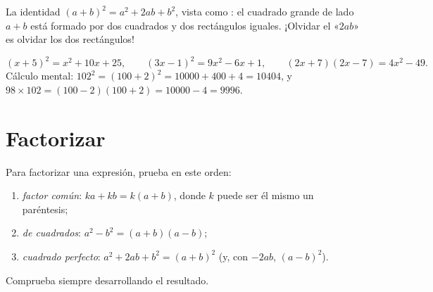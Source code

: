 \begin{omfigure}

{\small La identidad $(a+b)^2 = a^2 + 2ab + b^2$, vista como : el
cuadrado grande de lado $a+b$ está formado por dos cuadrados y dos rectángulos iguales.
¡Olvidar el «$2ab$» es olvidar los dos rectángulos!}
\end{omfigure}

\begin{example}\label{ex:g9:algebra:identities}
\[
(x + 5)^2 = x^2 + 10x + 25, \qquad
(3x - 1)^2 = 9x^2 - 6x + 1, \qquad
(2x + 7)(2x - 7) = 4x^2 - 49 .
\]
Cálculo mental: $102^2 = (100 + 2)^2 = 10000 + 400 + 4 = 10404$, y
$98 \times 102 = (100-2)(100+2) = 10000 - 4 = 9996$.
\end{example}

\section{Factorizar}

\begin{method}[Factorizar]\label{met:g9:algebra:factor}
Para factorizar una expresión, prueba en este orden:
\begin{enumerate}
  \item \emph{factor común}: $ka + kb = k(a + b)$, donde $k$ puede ser
        él mismo un paréntesis;
  \item \emph{ de cuadrados}: $a^2 - b^2 = (a+b)(a-b)$;
  \item \emph{cuadrado perfecto}: $a^2 + 2ab + b^2 = (a+b)^2$ (y, con
        $-2ab$, $(a-b)^2$).
\end{enumerate}
Comprueba siempre desarrollando el resultado.
\end{method}

